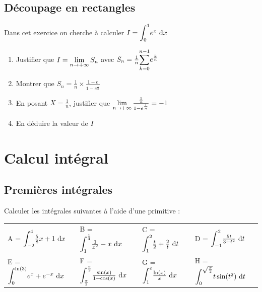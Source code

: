 \documentclass[oneside,12pt]{book}          %
\begin{document}
\subsection{Découpage en rectangles}
Dans cet exercice on cherche à calculer $I={\displaystyle\int_{0}^{1}}e^x{\,\,\mathrm{d}} x$
\begin{enumerate}
	\item Justifier que $I={\lim\limits_{n\to +\infty}}\, S_n$ avec $S_n=\frac{1}{n}{\displaystyle\sum_{k=0}^{n-1}}e^{\frac{k}{n}}$
	\item Montrer que $S_n=\frac{1}{n}\times\frac{1-e}{1-e^{\frac{1}{n}}}$
	\item En posant $X=\frac{1}{n}$, justifier que ${\lim\limits_{n\to +\infty}}\,\frac{\frac{1}{n}}{1-e^{\frac{1}{n}}}=-1$
	\item En déduire la valeur de $I$
\end{enumerate}



\section{Calcul intégral}

\subsection{Premières intégrales}
Calculer les intégrales suivantes à l'aide d'une primitive :

\begin{tabular}{p{} p{} p{} p{}}
    A = ${\displaystyle\int_{-2}^{4}}\frac{5}{8}x+1{\,\,\mathrm{d}} x$ & B = ${\displaystyle\int_{1}^{\frac{1}{4}}}\frac{1}{x^2}-x {\,\,\mathrm{d}} x$ & C = ${\displaystyle\int_{1}^{2}}\frac{t}{2}+\frac{2}{t}{\,\,\mathrm{d}} t$ & D = ${\displaystyle\int_{-1}^{2}}\frac{5t}{3+t^2}{\,\,\mathrm{d}} t$ \\
    E = ${\displaystyle\int_{0}^{\ln(3)}}e^x+e^{-x}{\,\,\mathrm{d}} x$ & F = ${\displaystyle\int_{\frac{\pi}{3}}^{\frac{\pi}{2}}}\frac{\sin(x)}{1+\cos(x)}{\,\,\mathrm{d}} x$ & G = ${\displaystyle\int_{1}^{e}}\frac{\ln(x)}{x}{\,\,\mathrm{d}} x$ & H = ${\displaystyle\int_{0}^{\sqrt{\frac{\pi}{2}}}}t\sin(t^2){\,\,\mathrm{d}} t$
\end{tabular}
\end{document}
